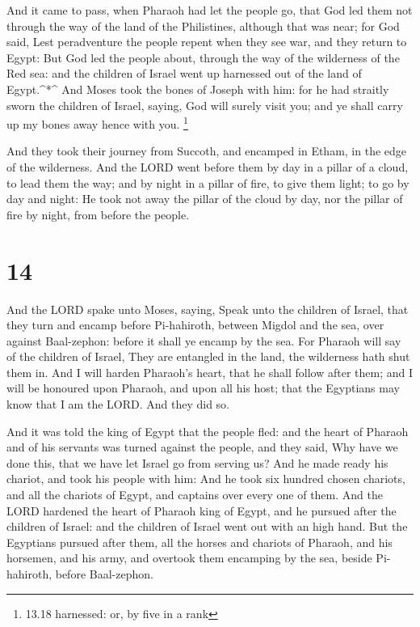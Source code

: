  And it came to pass, when Pharaoh had let the people go,
that God led them not through the way of the land of the Philistines,
although that was near; for God said, Lest peradventure the people
repent when they see war, and they return to Egypt:  But
God led the people about, through the way of the wilderness of the Red
sea: and the children of Israel went up harnessed out of the land of
Egypt.\^{}*\^{}  And Moses took the bones of Joseph with
him: for he had straitly sworn the children of Israel, saying, God will
surely visit you; and ye shall carry up my bones away hence with you.
\footnote{13.18 harnessed: or, by five in a rank}

 And they took their journey from Succoth, and encamped in
Etham, in the edge of the wilderness.  And the LORD went
before them by day in a pillar of a cloud, to lead them the way; and by
night in a pillar of fire, to give them light; to go by day and night:
 He took not away the pillar of the cloud by day, nor the
pillar of fire by night, from before the people.

\hypertarget{section-13}{%
\section{14}\label{section-13}}

 And the LORD spake unto Moses, saying,  Speak
unto the children of Israel, that they turn and encamp before
Pi-hahiroth, between Migdol and the sea, over against Baal-zephon:
before it shall ye encamp by the sea.  For Pharaoh will say
of the children of Israel, They are entangled in the land, the
wilderness hath shut them in.  And I will harden Pharaoh's
heart, that he shall follow after them; and I will be honoured upon
Pharaoh, and upon all his host; that the Egyptians may know that I am
the LORD. And they did so.

 And it was told the king of Egypt that the people fled: and
the heart of Pharaoh and of his servants was turned against the people,
and they said, Why have we done this, that we have let Israel go from
serving us?  And he made ready his chariot, and took his
people with him:  And he took six hundred chosen chariots,
and all the chariots of Egypt, and captains over every one of them.
 And the LORD hardened the heart of Pharaoh king of Egypt,
and he pursued after the children of Israel: and the children of Israel
went out with an high hand.  But the Egyptians pursued after
them, all the horses and chariots of Pharaoh, and his horsemen, and his
army, and overtook them encamping by the sea, beside Pi-hahiroth, before
Baal-zephon.

